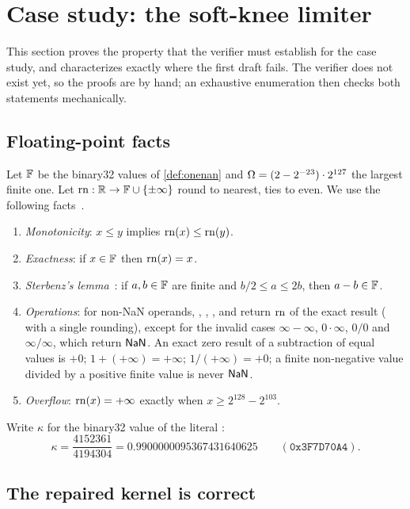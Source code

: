 \section{Case study: the soft-knee limiter}\label{sec:case}

This section proves the property that the verifier must establish for the case study, and
characterizes exactly where the first draft fails. The verifier does not exist yet, so the proofs
are by hand; an exhaustive enumeration then checks both statements mechanically.

\subsection{Floating-point facts}

Let $\mathbb{F}$ be the binary32 values of \cref{def:onenan} and
$\Omega=(2-2^{-23})\cdot2^{127}$ the largest finite one. Let $\mathrm{rn}:\mathbb{R}\to\mathbb{F}\cup\{\pm\infty\}$ round to
nearest, ties to even. We use the following facts~\cite{ieee754-2019,muller2018handbook}.
\begin{enumerate}[label=(F\arabic*),ref=F\arabic*]
\item\label{f:mono} \emph{Monotonicity}: $x\le y$ implies $\mathrm{rn}(x)\le\mathrm{rn}(y)$.
\item\label{f:exact} \emph{Exactness}: if $x\in\mathbb{F}$ then $\mathrm{rn}(x)=x$.
\item\label{f:sterbenz} \emph{Sterbenz's lemma}~\cite{sterbenz1974}: if $a,b\in\mathbb{F}$ are finite and
  $b/2\le a\le 2b$, then $a-b\in\mathbb{F}$.
\item\label{f:ops} \emph{Operations}: for non-NaN operands, , , ,
   and  return $\mathrm{rn}$ of the exact result ( with a single rounding),
  except for the invalid cases $\infty-\infty$, $0\cdot\infty$, $0/0$ and $\infty/\infty$,
  which return $\mathsf{NaN}$. An exact zero result of a subtraction of equal values is $+0$; $1+(+\infty)
  =+\infty$; $1/(+\infty)=+0$; a finite non-negative value divided by a positive finite value
  is never $\mathsf{NaN}$.
\item\label{f:overflow} \emph{Overflow}: $\mathrm{rn}(x)=+\infty$ exactly when $x\ge2^{128}-2^{103}$.
\end{enumerate}
Write $\kappa$ for the binary32 value of the literal :
\[
\kappa=\frac{4152361}{4194304}=0.9900000095367431640625\qquad(\texttt{0x3F7D70A4}).
\]

\subsection{The repaired kernel is correct}

